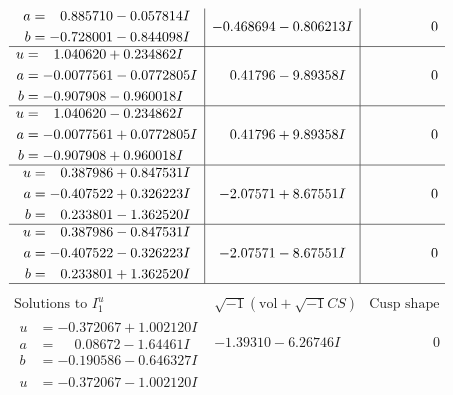 \documentclass[1p]{elsarticle_modified}
\theoremstyle{definition}
\newcommand{\I}{\sqrt{-1}}
\begin{document}
$$\begin{array}{c|c|c}
\begin{aligned}
a &= \phantom{-}0.885710 - 0.057814 I \\
b &= -0.728001 - 0.844098 I\end{aligned}
 & -0.468694 - 0.806213 I & \phantom{-0.000000 } 0 \\ \hline\begin{aligned}
u &= \phantom{-}1.040620 + 0.234862 I \\
a &= -0.0077561 - 0.0772805 I \\
b &= -0.907908 - 0.960018 I\end{aligned}
 & \phantom{-}0.41796 - 9.89358 I & \phantom{-0.000000 } 0 \\ \hline\begin{aligned}
u &= \phantom{-}1.040620 - 0.234862 I \\
a &= -0.0077561 + 0.0772805 I \\
b &= -0.907908 + 0.960018 I\end{aligned}
 & \phantom{-}0.41796 + 9.89358 I & \phantom{-0.000000 } 0 \\ \hline\begin{aligned}
u &= \phantom{-}0.387986 + 0.847531 I \\
a &= -0.407522 + 0.326223 I \\
b &= \phantom{-}0.233801 - 1.362520 I\end{aligned}
 & -2.07571 + 8.67551 I & \phantom{-0.000000 } 0 \\ \hline\begin{aligned}
u &= \phantom{-}0.387986 - 0.847531 I \\
a &= -0.407522 - 0.326223 I \\
b &= \phantom{-}0.233801 + 1.362520 I\end{aligned}
 & -2.07571 - 8.67551 I & \phantom{-0.000000 } 0\\
 \hline 
 \end{array}$$\newpage$$\begin{array}{c|c|c}  
\text{Solutions to }I^u_{1}& \I (\text{vol} + \sqrt{-1}CS) & \text{Cusp shape}\\
 \hline 
\begin{aligned}
u &= -0.372067 + 1.002120 I \\
a &= \phantom{-}0.08672 - 1.64461 I \\
b &= -0.190586 - 0.646327 I\end{aligned}
 & -1.39310 - 6.26746 I & \phantom{-0.000000 } 0 \\ \hline\begin{aligned}
u &= -0.372067 - 1.002120 I \\

\end{aligned}
\end{array}$$
\end{document}
